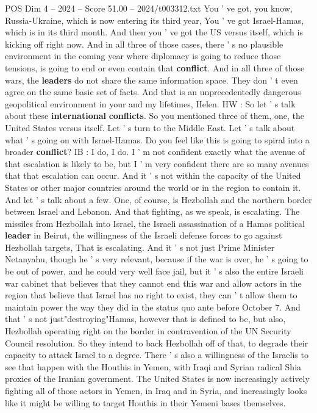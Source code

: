 \begin{textsample}{POS Dim 4 – 2024 – Score 51.00 – 2024/t003312.txt}
You ' ve got, you know, Russia-Ukraine, which is now entering its third year, You ' ve got Israel-Hamas, which is in its third month.
And then you ' ve got the US versus itself, which is kicking off right now.
And in all three of those cases, there ' s no plausible environment in the coming year where diplomacy is going to reduce those tensions, is going to end or even contain that \textbf{conflict}.
And in all three of those wars, the \textbf{leaders} do not share the same information space.
They don ' t even agree on the same basic set of facts.
And that is an unprecedentedly dangerous geopolitical environment in your and my lifetimes, Helen.
HW : So let ' s talk about these \textbf{international} \textbf{conflicts}.
So you mentioned three of them, one, the United States versus itself.
Let ' s turn to the Middle East.
Let ' s talk about what ' s going on with Israel-Hamas.
Do you feel like this is going to spiral into a broader \textbf{conflict}?
IB : I do, I do.
I ' m not confident exactly what the avenue of that escalation is likely to be, but I ' m very confident there are so many avenues that that escalation can occur.
And it ' s not within the capacity of the United States or other major countries around the world or in the region to contain it.
And let ' s talk about a few.
One, of course, is Hezbollah and the northern border between Israel and Lebanon.
And that fighting, as we speak, is escalating.
The missiles from Hezbollah into Israel, the Israeli assassination of a Hamas political \textbf{leader} in Beirut, the willingness of the Israeli defense forces to go against Hezbollah targets, That is escalating.
And it ' s not just Prime Minister Netanyahu, though he ' s very relevant, because if the war is over, he ' s going to be out of power, and he could very well face jail, but it ' s also the entire Israeli war cabinet that believes that they cannot end this war and allow actors in the region that believe that Israel has no right to exist, they can ' t allow them to maintain power the way they did in the status quo ante before October 7.
And that ' s not just"destroying"Hamas, however that is defined to be, but also, Hezbollah operating right on the border in contravention of the UN Security Council resolution.
So they intend to back Hezbollah off of that, to degrade their capacity to attack Israel to a degree.
There ' s also a willingness of the Israelis to see that happen with the Houthis in Yemen, with Iraqi and Syrian radical Shia proxies of the Iranian government.
The United States is now increasingly actively fighting all of those actors in Yemen, in Iraq and in Syria, and increasingly looks like it might be willing to target Houthis in their Yemeni bases themselves.

\end{textsample}
